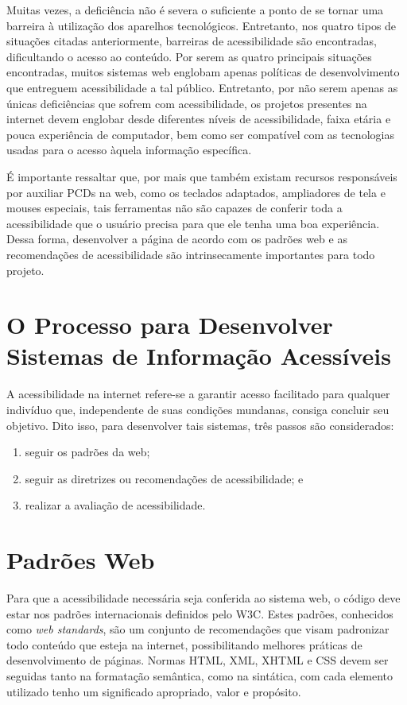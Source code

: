 \documentclass[
  12pt,
  openright,
  twoside,
  a4paper,
  english,
  french,
  spanish,
  brazil
]{abntex2}
\begin{document}
Muitas vezes, a deficiência não é severa o suficiente a ponto de se tornar uma
barreira à utilização dos aparelhos tecnológicos. Entretanto, nos quatro tipos
de situações citadas anteriormente, barreiras de acessibilidade são encontradas,
dificultando o acesso ao conteúdo. Por serem as quatro principais situações
encontradas, muitos sistemas web englobam apenas políticas de desenvolvimento
que entreguem acessibilidade a tal público. Entretanto, por não serem apenas as
únicas deficiências que sofrem com acessibilidade, os projetos presentes na
internet devem englobar desde diferentes níveis de acessibilidade, faixa etária
e pouca experiência de computador, bem como ser compatível com as tecnologias
usadas para o acesso àquela informação específica.

É importante ressaltar que, por mais que também existam recursos responsáveis
por auxiliar PCDs na web, como os teclados adaptados, ampliadores de tela e
mouses especiais, tais ferramentas não são capazes de conferir toda a
acessibilidade que o usuário precisa para que ele tenha uma boa experiência.
Dessa forma, desenvolver a página de acordo com os padrões web e as
recomendações de acessibilidade são intrinsecamente importantes para todo
projeto.

\section{O Processo para Desenvolver Sistemas de Informação Acessíveis}

A acessibilidade na internet refere-se a garantir acesso facilitado para
qualquer indivíduo que, independente de suas condições mundanas, consiga
concluir seu objetivo. Dito isso, para desenvolver tais sistemas, três passos
são considerados:

\begin{enumerate}
  \item seguir os padrões da web;
  \item seguir as diretrizes ou recomendações de acessibilidade; e
  \item realizar a avaliação de acessibilidade.
\end{enumerate}

\section{Padrões Web}

Para que a acessibilidade necessária seja conferida ao sistema web, o código
deve estar nos padrões internacionais definidos pelo W3C. Estes padrões,
conhecidos como \textit{web standards}, são um conjunto de recomendações que
visam padronizar todo conteúdo que esteja na internet, possibilitando melhores
práticas de desenvolvimento de páginas. Normas HTML, XML, XHTML e CSS devem ser
seguidas tanto na formatação semântica, como na sintática, com cada elemento
utilizado tenho um significado apropriado, valor e propósito.
\end{document}

